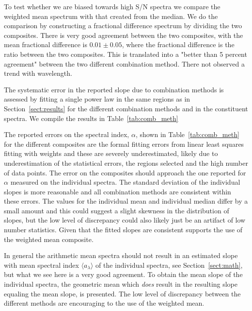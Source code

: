 \documentclass{aa}    %
\newcommand{\Tab}[1]{Table~\ref{tab:#1}}
\newcommand{\tab}[1]{\Tab{#1}}
\newcommand{\tablabel}[1]{\label{tab:#1}}
\newcommand{\sectionname}{Section}
\newcommand{\Sect}[1]{\sectionname~\ref{sect:#1}}
\newcommand{\sect}[1]{\Sect{#1}}
\begin{document}
To test whether we are biased towards high S/N spectra we compare the weighted mean spectrum with that created from the median. We do the comparison by constructing a fractional difference spectrum by dividing the two composites. There is very good agreement between the two composites, with the mean fractional difference is $0.01 \pm 0.05$, where the fractional difference is the ratio between the two composites. This is translated into a "better than 5 percent agreement" between the two different combination method. There not observed a trend with wavelength.

The systematic error in the reported slope due to combination methods is assessed by fitting a single power law in the same regions as in \sect{results} for the different combination methods and in the constituent spectra. We compile the results in \tab{comb_meth}

 \tablabel{comb_meth} 

The reported errors on the spectral index, $\alpha$, shown in \tab{comb_meth} for the different composites are the formal fitting errors from linear least squares fitting with weights and these are severely underestimated, likely due to underestimation of the statistical errors, the regions selected and the high number of data points. The error on the composites should approach the one reported for $\alpha$ measured on the individual spectra. The standard deviation of the individual slopes is more reasonable and all combination methods are consistent within these errors. The values for the individual mean and individual median differ by a small amount and this could suggest a slight skewness in the distribution of slopes, but the low level of discrepancy could also likely just be an artifact of low number statistics. Given that the fitted slopes are consistent supports the use of the weighted mean composite.

In general the arithmetic mean spectra should not result in an estimated slope with mean spectral index $\langle a_\lambda\rangle$ of the individual spectra, see \sect{math}, but what we see here is a very good agreement. To obtain the mean slope of the individual spectra, the geometric mean which \textit{does} result in the resulting slope equaling the mean slope, is presented. The low level of discrepancy between the different methods are encouraging to the use of the weighted mean.
\end{document}
